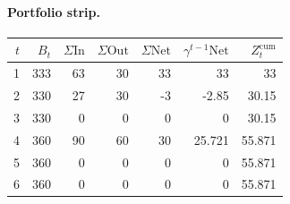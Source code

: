 \documentclass[12pt, a4paper]{article}
\begin{document}
\paragraph{Portfolio strip.}
\begin{center}
\begin{tabular}{rrrrrrr}
\toprule
$t$ & $B_t$ & $\Sigma\mathrm{In}$ & $\Sigma\mathrm{Out}$ & $\Sigma\mathrm{Net}$ & $\gamma^{t-1}\mathrm{Net}$ & $Z_t^{\mathrm{cum}}$\\
\midrule
1 & 333 & 63 & 30 & 33 & 33 & 33 \\
2 & 330 & 27 & 30 & -3 & -2.85 & 30.15 \\
3 & 330 & 0 & 0 & 0 & 0 & 30.15 \\
4 & 360 & 90 & 60 & 30 & 25.721 & 55.871 \\
5 & 360 & 0 & 0 & 0 & 0 & 55.871 \\
6 & 360 & 0 & 0 & 0 & 0 & 55.871 \\
\bottomrule
\end{tabular}
\end{center}
\end{document}
